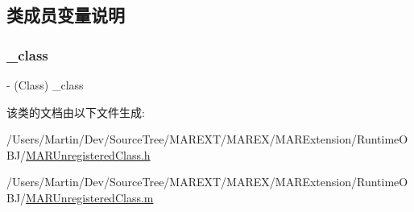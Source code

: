 \subsection{类成员变量说明}
\mbox{\label{interface_m_a_r_unregistered_class_ae5619e1545994e8d035de4baec5fa711}} 
\subsubsection{\texorpdfstring{\+\_\+class}{\_class}}
{\footnotesize\ttfamily -\/ (Class) \+\_\+class\hspace{0.3cm}{\ttfamily [protected]}}



该类的文档由以下文件生成\+:\begin{DoxyCompactItemize}
\item 
/\+Users/\+Martin/\+Dev/\+Source\+Tree/\+M\+A\+R\+E\+X\+T/\+M\+A\+R\+E\+X/\+M\+A\+R\+Extension/\+Runtime\+O\+B\+J/\hyperlink{_m_a_r_unregistered_class_8h}{M\+A\+R\+Unregistered\+Class.\+h}\item 
/\+Users/\+Martin/\+Dev/\+Source\+Tree/\+M\+A\+R\+E\+X\+T/\+M\+A\+R\+E\+X/\+M\+A\+R\+Extension/\+Runtime\+O\+B\+J/\hyperlink{_m_a_r_unregistered_class_8m}{M\+A\+R\+Unregistered\+Class.\+m}\end{DoxyCompactItemize}

